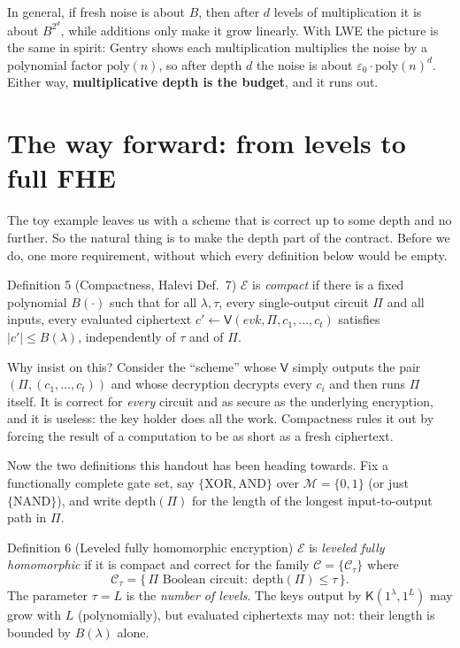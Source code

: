 \documentclass[11pt,a4paper]{article}
\newcommand{\Eval}{\mathsf{V}}
\newcommand{\KeyGen}{\mathsf{K}}
\newcommand{\evk}{\mathit{evk}}
\newcommand{\Msg}{\mathcal{M}}
\begin{document}
\begin{aside}
In general, if fresh noise is about $B$, then after $d$ levels of
multiplication it is about $B^{2^d}$, while additions only make it grow
linearly. With LWE the picture is the same in spirit: Gentry shows each
multiplication multiplies the noise by a polynomial factor $\mathrm{poly}(n)$,
so after depth $d$ the noise is about $\varepsilon_0\cdot\mathrm{poly}(n)^d$.
Either way, \textbf{multiplicative depth is the budget}, and it runs out.
\end{aside}

\section{The way forward: from levels to full FHE}

The toy example leaves us with a scheme that is correct up to some depth and
no further. So the natural thing is to make the depth part of the contract.
Before we do, one more requirement, without which every definition below
would be empty.

\begin{formal}{Definition 5 (Compactness, Halevi Def.~7)}
$\mathcal{E}$ is \emph{compact} if there is a fixed polynomial $B(\cdot)$ such
that for all $\lambda,\tau$, every single-output circuit $\Pi$ and all inputs,
every evaluated ciphertext $c'\gets\Eval(\evk,\Pi,c_1,\dots,c_t)$ satisfies
$|c'|\le B(\lambda)$, independently of $\tau$ and of $\Pi$.
\end{formal}

\noindent
Why insist on this? Consider the ``scheme'' whose $\Eval$ simply outputs the
pair $(\Pi,(c_1,\dots,c_t))$ and whose decryption decrypts every $c_i$ and then
runs $\Pi$ itself. It is correct for \emph{every} circuit and as secure as the
underlying encryption, and it is useless: the key holder does all the work.
Compactness rules it out by forcing the result of a computation to be as
short as a fresh ciphertext.

Now the two definitions this handout has been heading towards. Fix a
functionally complete gate set, say $\{\mathrm{XOR},\mathrm{AND}\}$ over
$\Msg=\{0,1\}$ (or just $\{\mathrm{NAND}\}$), and write $\mathrm{depth}(\Pi)$
for the length of the longest input-to-output path in $\Pi$.

\begin{formal}{Definition 6 (Leveled fully homomorphic encryption)}
$\mathcal{E}$ is \emph{leveled fully homomorphic} if it is compact and correct
for the family $\mathcal{C}=\{\mathcal{C}_\tau\}$ where
\[
\mathcal{C}_\tau=\{\,\Pi \text{ Boolean circuit}:\ \mathrm{depth}(\Pi)\le\tau\,\}.
\]
The parameter $\tau=L$ is the \emph{number of levels}. The keys output by
$\KeyGen(1^\lambda,1^L)$ may grow with $L$ (polynomially), but evaluated
ciphertexts may not: their length is bounded by $B(\lambda)$ alone.
\end{formal}
\end{document}
